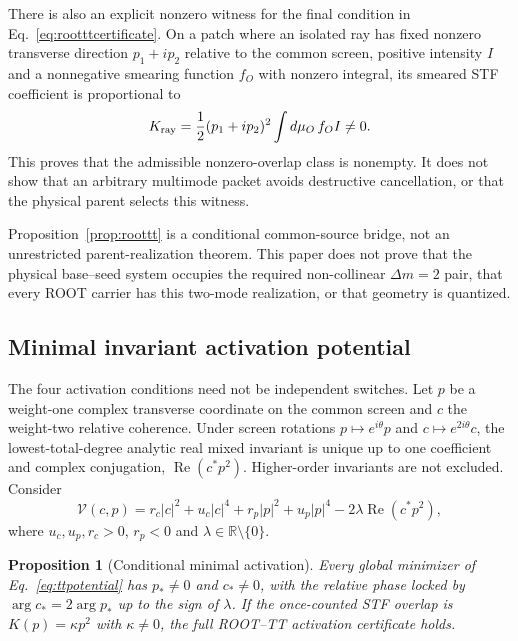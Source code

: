 \documentclass[11pt]{article}
\newtheorem{proposition}{Proposition}
\begin{document}
There is also an explicit nonzero witness for the final condition in
Eq.~\eqref{eq:rootttcertificate}.  On a patch where an isolated ray has fixed
nonzero transverse direction $p_1+ip_2$ relative to the common screen,
positive intensity $I$ and a nonnegative smearing function $f_O$ with
nonzero integral, its smeared STF coefficient is proportional to
\begin{equation}
 K_{\rm ray}={1\over2}(p_1+ip_2)^2
 \int d\mu_O\,f_O I\neq0.
\label{eq:nonzerokwitness}
\end{equation}
This proves that the admissible nonzero-overlap class is nonempty.  It does
not show that an arbitrary multimode packet avoids destructive cancellation,
or that the physical parent selects this witness.

Proposition~\ref{prop:roottt} is a conditional common-source bridge, not an
unrestricted parent-realization theorem.  This paper does not prove that the physical
base--seed system occupies the required non-collinear $\Delta m=2$ pair, that
every ROOT carrier has this two-mode realization, or that geometry is
quantized.

\subsection{Minimal invariant activation potential}

The four activation conditions need not be independent switches.  Let $p$ be
a weight-one complex transverse coordinate on the common screen and $c$ the
weight-two relative coherence.  Under screen rotations
$p\mapsto e^{i\theta}p$ and $c\mapsto e^{2i\theta}c$, the
lowest-total-degree analytic real mixed invariant is unique up to one
coefficient and complex conjugation, $\operatorname{Re}(c^*p^2)$.
Higher-order invariants are not excluded.  Consider
\begin{equation}
\mathcal V(c,p)=r_c|c|^2+u_c|c|^4+r_p|p|^2+u_p|p|^4
-2\lambda\operatorname{Re}(c^*p^2),
\label{eq:ttpotential}
\end{equation}
where $u_c,u_p,r_c>0$, $r_p<0$ and
$\lambda\in\mathbb R\setminus\{0\}$.

\begin{proposition}[Conditional minimal activation]
\label{prop:ttpotential}
Every global minimizer of Eq.~\eqref{eq:ttpotential} has $p_*\neq0$ and
$c_*\neq0$, with the relative phase locked by
$\arg c_*=2\arg p_*$ up to the sign of $\lambda$.  If the once-counted STF
overlap is $K(p)=\kappa p^2$ with $\kappa\neq0$, the full ROOT--TT activation
certificate holds.
\end{proposition}
\end{document}
